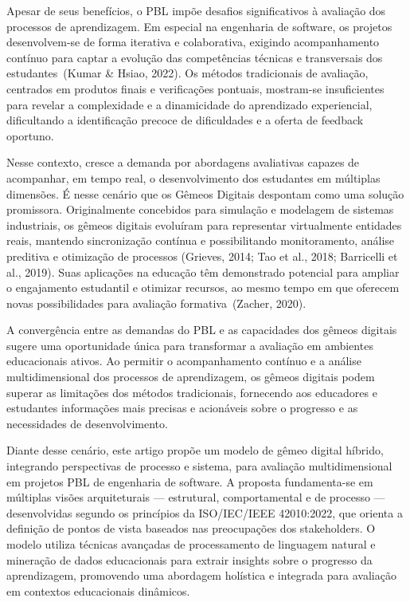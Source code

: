 \documentclass[english, spanish, brazilian]{modelo_dt}
\begin{document}
Apesar de seus benefícios, o PBL impõe desafios significativos à avaliação dos
processos de aprendizagem. Em especial na engenharia de software, os projetos
desenvolvem-se de forma iterativa e colaborativa, exigindo acompanhamento
contínuo para captar a evolução das competências técnicas e transversais dos
estudantes~(Kumar \& Hsiao, 2022). Os métodos tradicionais de avaliação,
centrados em produtos finais e verificações pontuais, mostram-se insuficientes
para revelar a complexidade e a dinamicidade do aprendizado experiencial,
dificultando a identificação precoce de dificuldades e a oferta de feedback
oportuno.

Nesse contexto, cresce a demanda por abordagens avaliativas capazes de
acompanhar, em tempo real, o desenvolvimento dos estudantes em múltiplas
dimensões. É nesse cenário que os Gêmeos Digitais despontam como uma solução
promissora. Originalmente concebidos para simulação e modelagem de sistemas
industriais, os gêmeos digitais evoluíram para representar virtualmente
entidades reais, mantendo sincronização contínua e possibilitando
monitoramento, análise preditiva e otimização de processos (Grieves, 2014; Tao
et al., 2018; Barricelli et al., 2019). Suas aplicações na educação têm
demonstrado potencial para ampliar o engajamento estudantil e otimizar
recursos, ao mesmo tempo em que oferecem novas possibilidades para avaliação
formativa~(Zacher, 2020).

A convergência entre as demandas do PBL e as capacidades dos gêmeos digitais
sugere uma oportunidade única para transformar a avaliação em ambientes
educacionais ativos. Ao permitir o acompanhamento contínuo e a análise
multidimensional dos processos de aprendizagem, os gêmeos digitais podem
superar as limitações dos métodos tradicionais, fornecendo aos educadores e
estudantes informações mais precisas e acionáveis sobre o progresso e as
necessidades de desenvolvimento.

Diante desse cenário, este artigo propõe um modelo de gêmeo digital híbrido,
integrando perspectivas de processo e sistema, para avaliação multidimensional
em projetos PBL de engenharia de software. A proposta fundamenta-se em múltiplas
visões arquiteturais — estrutural, comportamental e de processo — desenvolvidas segundo os princípios da ISO/IEC/IEEE 42010:2022, que orienta a definição de pontos de vista baseados nas preocupações dos stakeholders. O modelo utiliza
técnicas avançadas de processamento de linguagem natural e mineração de dados
educacionais para extrair insights sobre o progresso da aprendizagem,
promovendo uma abordagem holística e integrada para avaliação em contextos
educacionais dinâmicos.
\end{document}
